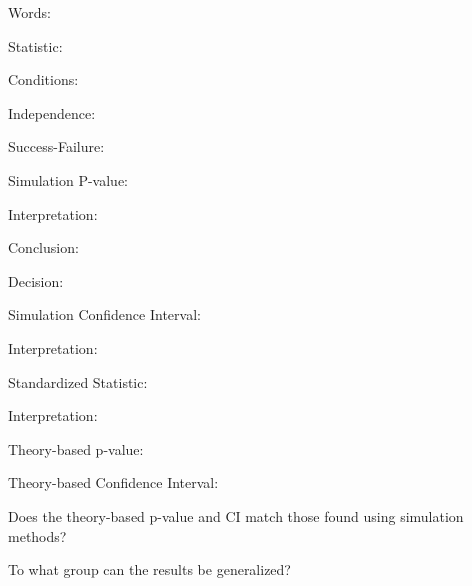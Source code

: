 \documentclass[
]{report}
\newcommand{\rgi}{\hspace{24pt}}  %
\begin{document}
\rgi \rgi Words:

\vspace{0.5in}

\rgi Statistic:

\vspace{0.3in}

\rgi Conditions:

\rgi \rgi Independence:

\vspace{0.8in}

\rgi \rgi Success-Failure:

\vspace{0.8in}

\rgi Simulation P-value:

\vspace{0.3in}

\rgi \rgi Interpretation:

\vspace{0.8in}

\rgi \rgi Conclusion:

\vspace{0.8in}

\rgi \rgi Decision:

\vspace{0.3in}

\rgi Simulation Confidence Interval:

\vspace{0.3in}

\rgi \rgi Interpretation:

\vspace{0.8in}

\rgi Standardized Statistic:

\vspace{0.3in}

\rgi \rgi Interpretation:

\vspace{0.8in}

\rgi Theory-based p-value:

\vspace{0.3in}

\rgi Theory-based Confidence Interval:

\vspace{0.3in}

\rgi Does the theory-based p-value and CI match those found using simulation methods?

\vspace{0.8in}

\rgi To what group can the results be generalized?
\end{document}
